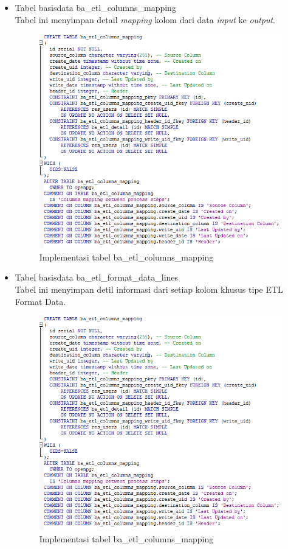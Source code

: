 \begin{itemize}
	\item Tabel basisdata ba\_etl\_columns\_mapping\\
	Tabel ini menyimpan detail \textit{mapping} kolom dari data \textit{input} ke \textit{output}.
	\begin{figure}[H]
		\centering
		\includegraphics[scale=0.5]{Gambar/tabel-ba-etl-columns-mapping}
		\caption{Implementasi tabel ba\_etl\_columns\_mapping}
		\end{figure}
	
	\item Tabel basisdata ba\_etl\_format\_data\_lines\\ Tabel ini menyimpan detil informasi dari setiap kolom khusus tipe ETL Format Data.
	\begin{figure}[H]
		\centering
		\includegraphics[scale=0.5]{Gambar/tabel-ba-etl-columns-mapping}
		\caption{Implementasi tabel ba\_etl\_columns\_mapping}
		\end{figure}
	

\end{itemize}

